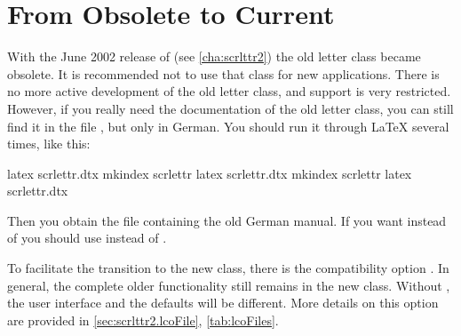 %
%
%
%
%
%
%
%
%
%
%
%

\section{From Obsolete  to Current }
\label{sec:scrlttr2-experts.fromscrlettr}

With the June 2002 release of  (see
\autoref{cha:scrlttr2}) the old letter class  became
obsolete. It is recommended not to use that class for new applications. There
is no more active development of the old letter class, and support is very
restricted. However, if you really need the documentation of the old letter
class, you can still find it in the file , but only in
German. You should run it through {\LaTeX} several times, like this:
\begin{lstoutput}[belowskip=\dp\strutbox,morekeywords={latex,mkindex}]
  latex scrlettr.dtx
  mkindex scrlettr
  latex scrlettr.dtx
  mkindex scrlettr
  latex scrlettr.dtx
\end{lstoutput}
Then you obtain the file  containing the old German
manual. If you want  instead of  you
should use  instead of .

To facilitate the transition to the new class, there is the compatibility
option . In general, the complete older functionality still
remains in the new class.  Without , the user
interface and the defaults will be different. More details on
this option are provided in \autoref{sec:scrlttr2.lcoFile},
\autoref{tab:lcoFiles}.


%

\endinput

